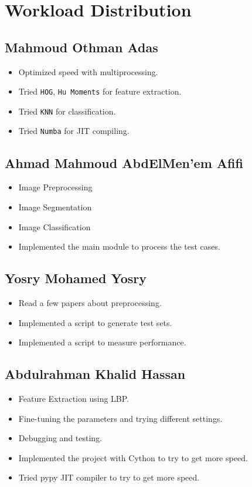 \section{Workload Distribution}

\subsection{Mahmoud Othman Adas}
\begin{itemize}
    \item Optimized speed with multiprocessing.
    \item Tried \texttt{HOG}, \texttt{Hu Moments} for feature extraction.
    \item Tried \texttt{KNN} for classification.
    \item Tried \texttt{Numba} for JIT compiling.
\end{itemize}

\subsection{Ahmad Mahmoud AbdElMen'em Afifi}
\begin{itemize}
    \item Image Preprocessing
    \item Image Segmentation
    \item Image Classification
    \item Implemented the main module to process the test cases.
\end{itemize}

\subsection{Yosry Mohamed Yosry}
\begin{itemize}
    \item Read a few papers about preprocessing.
    \item Implemented a script to generate test sets.
    \item Implemented a script to measure performance.
\end{itemize}

\subsection{Abdulrahman Khalid Hassan}
\begin{itemize}
    \item Feature Extraction using LBP.
    \item Fine-tuning the parameters and trying different settings.
    \item Debugging and testing.
    \item Implemented the project with Cython to try to get more speed.
    \item Tried pypy JIT compiler to try to get more speed.
\end{itemize}
